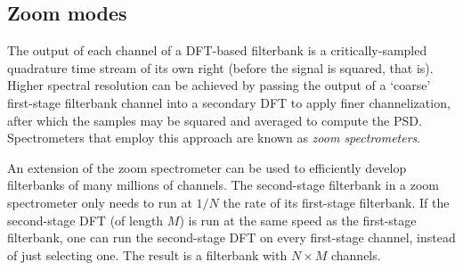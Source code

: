 \documentclass{ws-rv961x669}
\begin{document}



\subsection{Zoom modes}

The output of each channel of a DFT-based filterbank is a critically-sampled quadrature time stream of its own right (before the signal is squared, that is). Higher spectral resolution can be achieved by passing the output of a `coarse' first-stage filterbank channel into a secondary DFT to apply finer channelization, after which the samples may be squared and averaged to compute the PSD. Spectrometers that employ this approach are known as \emph{zoom spectrometers}. 

An extension of the zoom spectrometer can be used to efficiently develop filterbanks of many millions of channels. The second-stage filterbank in a zoom spectrometer only needs to run at $1/N$ the rate of its first-stage filterbank. If the second-stage DFT (of length $M$) is run at the same speed as the first-stage filterbank, one can run the second-stage DFT on every first-stage channel, instead of just selecting one. The result is a filterbank with $N\times M$ channels. 
\end{document}
